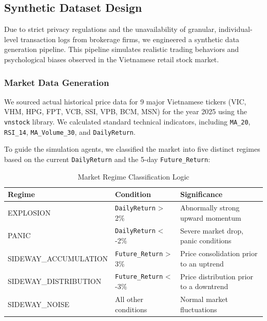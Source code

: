 \subsection{Synthetic Dataset Design}
Due to strict privacy regulations and the unavailability of granular, individual-level transaction logs from brokerage firms, we engineered a synthetic data generation pipeline. This pipeline simulates realistic trading behaviors and psychological biases observed in the Vietnamese retail stock market.

\subsubsection{Market Data Generation}
We sourced actual historical price data for 9 major Vietnamese tickers (VIC, VHM, HPG, FPT, VCB, SSI, VPB, BCM, MSN) for the year 2025 using the \texttt{vnstock} library. We calculated standard technical indicators, including \texttt{MA\_20}, \texttt{RSI\_14}, \texttt{MA\_Volume\_30}, and \texttt{DailyReturn}. 

To guide the simulation agents, we classified the market into five distinct regimes based on the current \texttt{DailyReturn} and the 5-day \texttt{Future\_Return}:

\begin{table}[h!]
\centering
\begin{tabular}{|l|l|l|}
\hline
\textbf{Regime} & \textbf{Condition} & \textbf{Significance} \\ \hline
EXPLOSION & \texttt{DailyReturn} > 2\% & Abnormally strong upward momentum \\ \hline
PANIC & \texttt{DailyReturn} < -2\% & Severe market drop, panic conditions \\ \hline
SIDEWAY\_ACCUMULATION & \texttt{Future\_Return} > 3\% & Price consolidation prior to an uptrend \\ \hline
SIDEWAY\_DISTRIBUTION & \texttt{Future\_Return} < -3\% & Price distribution prior to a downtrend \\ \hline
SIDEWAY\_NOISE & All other conditions & Normal market fluctuations \\ \hline
\end{tabular}
\caption{Market Regime Classification Logic}
\end{table}

